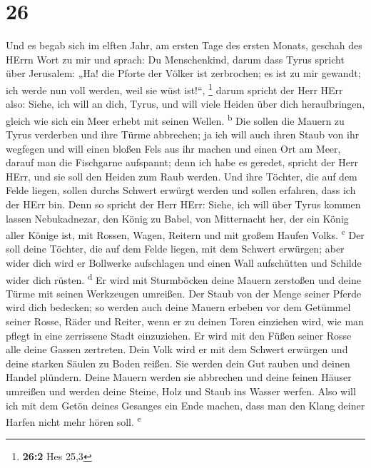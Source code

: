 \hypertarget{section-25}{%
\section{26}\label{section-25}}

 Und es begab sich im elften Jahr, am ersten Tage des
ersten Monats, geschah des HErrn Wort zu mir und sprach: 
Du Menschenkind, darum dass Tyrus spricht über Jerusalem: „Ha! die
Pforte der Völker ist zerbrochen; es ist zu mir gewandt; ich werde nun
voll werden, weil sie wüst ist!{}``, \footnote{\textbf{26:2} Hes 25,3}
 darum spricht der Herr HErr also: Siehe, ich will an
dich, Tyrus, und will viele Heiden über dich heraufbringen, gleich wie
sich ein Meer erhebt mit seinen Wellen. \textsuperscript{b}
 Die sollen die Mauern zu Tyrus verderben und ihre Türme
abbrechen; ja ich will auch ihren Staub von ihr wegfegen und will einen
bloßen Fels aus ihr machen  und einen Ort am Meer, darauf
man die Fischgarne aufspannt; denn ich habe es geredet, spricht der Herr
HErr, und sie soll den Heiden zum Raub werden.  Und ihre
Töchter, die auf dem Felde liegen, sollen durchs Schwert erwürgt werden
und sollen erfahren, dass ich der HErr bin.  Denn so
spricht der Herr HErr: Siehe, ich will über Tyrus kommen lassen
Nebukadnezar, den König zu Babel, von Mitternacht her, der ein König
aller Könige ist, mit Rossen, Wagen, Reitern und mit großem Haufen
Volks. \textsuperscript{c}  Der soll deine Töchter, die
auf dem Felde liegen, mit dem Schwert erwürgen; aber wider dich wird er
Bollwerke aufschlagen und einen Wall aufschütten und Schilde wider dich
rüsten. \textsuperscript{d}  Er wird mit Sturmböcken deine
Mauern zerstoßen und deine Türme mit seinen Werkzeugen umreißen.
 Der Staub von der Menge seiner Pferde wird dich
bedecken; so werden auch deine Mauern erbeben vor dem Getümmel seiner
Rosse, Räder und Reiter, wenn er zu deinen Toren einziehen wird, wie man
pflegt in eine zerrissene Stadt einzuziehen.  Er wird mit
den Füßen seiner Rosse alle deine Gassen zertreten. Dein Volk wird er
mit dem Schwert erwürgen und deine starken Säulen zu Boden reißen.
 Sie werden dein Gut rauben und deinen Handel plündern.
Deine Mauern werden sie abbrechen und deine feinen Häuser umreißen und
werden deine Steine, Holz und Staub ins Wasser werfen. 
Also will ich mit dem Getön deines Gesanges ein Ende machen, dass man
den Klang deiner Harfen nicht mehr hören soll. \textsuperscript{e}

